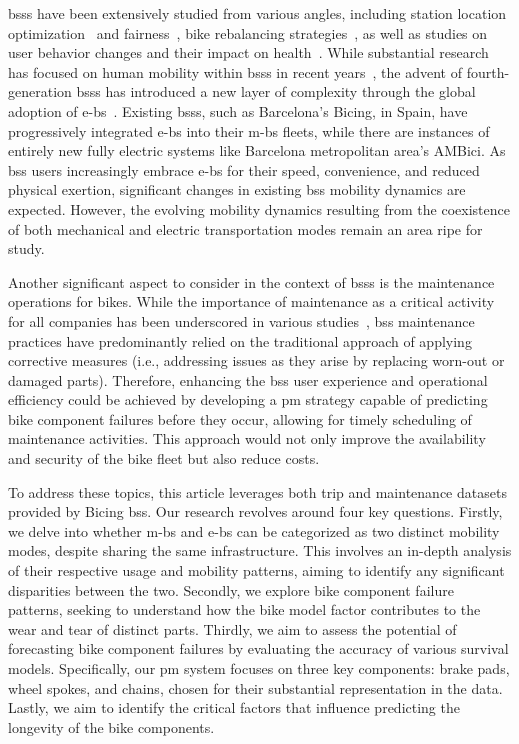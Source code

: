\acp{bss} have been extensively studied from various angles, including station location optimization~\cite{Liu2015} and fairness~\cite{DuranRodas2020}, bike rebalancing strategies~\cite{Chardon2016}, as well as studies on user behavior changes and their impact on health~\cite{Ma2020, Qiu2018}. While substantial research has focused on human mobility within \acp{bss} in recent years~\cite{Talavera_Garcia2021, Kon2021}, the advent of fourth-generation \acp{bss} has introduced a new layer of complexity through the global adoption of \acp{e-b}~\cite{Shaheen2010, MeddinWorldMapReport2022}. Existing \acp{bss}, such as Barcelona's Bicing, in Spain, have progressively integrated \acp{e-b} into their \acp{m-b} fleets, while there are instances of entirely new fully electric systems like Barcelona metropolitan area's AMBici. As \ac{bss} users increasingly embrace \acp{e-b} for their speed, convenience, and reduced physical exertion, significant changes in existing \ac{bss} mobility dynamics are expected. However, the evolving mobility dynamics resulting from the coexistence of both mechanical and electric transportation modes remain an area ripe for study.

Another significant aspect to consider in the context of \acp{bss} is the maintenance operations for bikes. While the importance of maintenance as a critical activity for all companies has been underscored in various studies~\cite{Cho1991, Reinertsen1996}, \ac{bss} maintenance practices have predominantly relied on the traditional approach of applying corrective measures (i.e., addressing issues as they arise by replacing worn-out or damaged parts). Therefore, enhancing the \ac{bss} user experience and operational efficiency could be achieved by developing a \ac{pm} strategy capable of predicting bike component failures before they occur, allowing for timely scheduling of maintenance activities. This approach would not only improve the availability and security of the bike fleet but also reduce costs.

To address these topics, this article leverages both trip and maintenance datasets provided by Bicing \ac{bss}. Our research revolves around four key questions. Firstly, we delve into whether \acp{m-b} and \acp{e-b} can be categorized as two distinct mobility modes, despite sharing the same infrastructure. This involves an in-depth analysis of their respective usage and mobility patterns, aiming to identify any significant disparities between the two. Secondly, we explore bike component failure patterns, seeking to understand how the bike model factor contributes to the wear and tear of distinct parts. Thirdly, we aim to assess the potential of forecasting bike component failures by evaluating the accuracy of various survival models. Specifically, our \ac{pm} system focuses on three key components: brake pads, wheel spokes, and chains, chosen for their substantial representation in the data. Lastly, we aim to identify the critical factors that influence predicting the longevity of the bike components.


